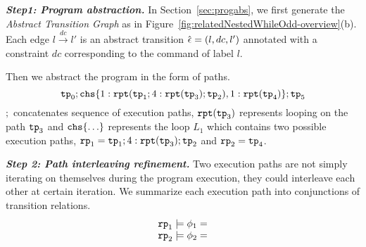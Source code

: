 
\textbf{\emph{Step1: Program abstraction.}}
In Section~\ref{sec:progabs},
we first 
generate the \emph{Abstract Transition Graph} as in Figure~\ref{fig:relatedNestedWhileOdd-overview}(b).
Each edge $l \xrightarrow{dc} l'$ is an abstract transition $\hat{\mathtt{\epsilon}{}} = (l, dc, l')$ annotated with a constraint $dc$ corresponding to the command of label $l$.

Then we abstract the program in the form of paths.
$$
\tpath_0 ; \rpchoose{ 1: \rprepeat(\tpath_1; 4:\rprepeat(\tpath_3); \tpath_2), 1:\rprepeat(\tpath_4) }; \tpath_5
$$
$;$ concatenates sequence of execution paths,
$\mathtt{rpt}(\mathtt{tp}_3)$ represents looping on the path $\mathtt{tp}_3$ and
$\rpchoose{ \ldots}$ represents the loop $L_1$ which contains two possible execution paths,
$\mathtt{rp}_1 = \mathtt{tp}_1; 4:\mathtt{rpt}(\mathtt{tp}_3);\mathtt{tp}_2$ and $\mathtt{rp}_2 =\mathtt{tp}_4$.

\textbf{\emph{Step 2: Path interleaving refinement.}} 
Two execution paths are not simply iterating on themselves during the program execution,
they could interleave each other at certain iteration.
We summarize each execution path into conjunctions of transition relations.
\begin{equation}
    \begin{array}{l}
        \mathtt{rp}_1 \models \phi_1 = \\
    \mathtt{rp}_2 \models \phi_2 = 
    \end{array}
\end{equation}
  
